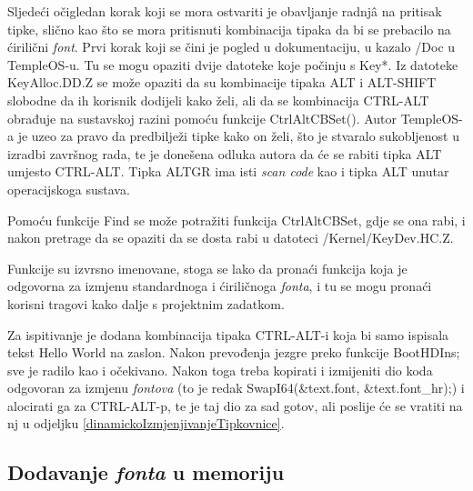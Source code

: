 \documentclass{foi}
\begin{document}
Sljedeći očigledan korak koji se mora ostvariti je obavljanje radnjâ na pritisak tipke, slično kao što se mora pritisnuti kombinacija tipaka da bi se prebacilo na ćirilični \emph{font}. Prvi korak koji se čini je pogled u dokumentaciju, u kazalo {\selectfont /Doc} u TempleOS-u. Tu se mogu opaziti dvije datoteke koje počinju s {\selectfont Key*}. Iz datoteke {\selectfont KeyAlloc.DD.Z} se može opaziti da su kombinacije tipaka {\selectfont ALT} i {\selectfont ALT-SHIFT} slobodne da ih korisnik dodijeli kako želi, ali da se kombinacija {\selectfont CTRL-ALT} obrađuje na sustavskoj razini pomoću funkcije {\selectfont CtrlAltCBSet()}. Autor TempleOS-a je uzeo za pravo da predbilježi tipke kako on želi, što je stvaralo sukobljenost u izradbi završnog rada, te je donešena odluka autora da će se rabiti tipka {\selectfont ALT} umjesto {\selectfont CTRL-ALT}. Tipka {\selectfont ALTGR} ima isti \emph{scan code} kao i tipka {\selectfont ALT} unutar operacijskoga sustava.

Pomoću funkcije {\selectfont Find} se može potražiti funkcija {\selectfont CtrlAltCBSet}, gdje se ona rabi, i nakon pretrage da se opaziti da se dosta rabi u datoteci {\selectfont /Kernel/KeyDev.HC.Z}.

Funkcije su izvrsno imenovane, stoga se lako da pronaći funkcija koja je odgovorna za izmjenu standardnoga i ćiriličnoga \emph{fonta}, i tu se mogu pronaći korisni tragovi kako dalje s projektnim zadatkom.

Za ispitivanje je dodana kombinacija tipaka {\selectfont CTRL-ALT-i} koja bi samo ispisala tekst {\selectfont Hello World} na zaslon. Nakon prevođenja jezgre preko funkcije {\selectfont BootHDIns;} sve je radilo kao i očekivano. Nakon toga treba kopirati i izmijeniti dio koda odgovoran za izmjenu \emph{fontova} (to je redak {\selectfont SwapI64(\&text.font, \&text.font\_hr);}) i alocirati ga za {\selectfont CTRL-ALT-p}, te je taj dio za sad gotov, ali poslije će se vratiti na nj u odjeljku \ref{dinamickoIzmjenjivanjeTipkovnice}.

\subsection{Dodavanje \emph{fonta} u memoriju}
\end{document}
